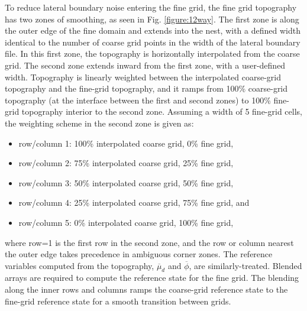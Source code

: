To reduce lateral boundary noise entering the fine grid, the fine grid topography has two 
zones of smoothing, as seen in Fig. \ref{figure:12way}.
The first zone is along the outer edge of the fine domain and 
extends into the nest, with a defined width identical to the number of coarse grid points
in the width of the lateral boundary file.  In this first zone, the topography is horizontally
interpolated from the coarse grid.  The second zone extends inward from the first zone, with a
user-defined width.  Topography is linearly weighted between the interpolated coarse-grid
topography and the fine-grid topography, and it ramps from 100\% coarse-grid 
topography (at the interface between the 
first and second zones) to 100\%
fine-grid topography interior to the second zone.  
\noindent
Assuming a width of 5 fine-grid cells, the weighting scheme in the second zone is given as:
\begin{itemize}\setlength{\parskip}{-4pt}
\item row/column 1: 100\% interpolated coarse grid, 0\% fine grid,
\item row/column 2: 75\% interpolated coarse grid, 25\% fine grid,
\item row/column 3: 50\% interpolated coarse grid, 50\% fine grid,
\item row/column 4: 25\% interpolated coarse grid, 75\% fine grid, and
\item row/column 5: 0\% interpolated coarse grid, 100\% fine grid,
\end{itemize}
\noindent 
where row=1 is the first row in the second zone, and the row or column 
nearest the outer edge takes precedence in ambiguous corner zones.  
The reference variables computed from the topography,
$\overline{\mu}_d$ and $\overline{\phi}$, are similarly-treated.
Blended arrays are required to compute the reference state for the
fine grid.  The blending along the inner rows and columns ramps the 
coarse-grid reference state to the
fine-grid reference state for a smooth transition between grids.

